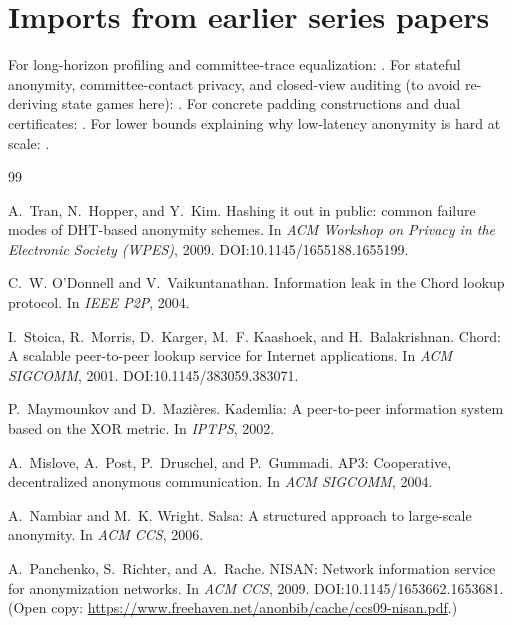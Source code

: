 \documentclass[11pt]{article}
\begin{document}
\section{Imports from earlier series papers}\label{sec:imports}
For long-horizon profiling and committee-trace equalization: \cite{series:profiling}.
For stateful anonymity, committee-contact privacy, and closed-view auditing (to avoid re-deriving state games here): \cite{series:state1,series:state2,series:state3}.
For concrete padding constructions and dual certificates: \cite{series:schedcompiler,series:knapsacktransport,series:prefixcapacities,series:stoptimeaddendum}.
For lower bounds explaining why low-latency anonymity is hard at scale: \cite{series:manytestinglowerbounds}.
\begin{thebibliography}{99}


A.~Tran, N.~Hopper, and Y.~Kim.
\newblock Hashing it out in public: common failure modes of DHT-based anonymity schemes.
\newblock In \emph{ACM Workshop on Privacy in the Electronic Society (WPES)}, 2009.
\newblock DOI:10.1145/1655188.1655199.

C.~W. O'Donnell and V.~Vaikuntanathan.
\newblock Information leak in the Chord lookup protocol.
\newblock In \emph{IEEE P2P}, 2004.

I.~Stoica, R.~Morris, D.~Karger, M.~F. Kaashoek, and H.~Balakrishnan.
\newblock Chord: A scalable peer-to-peer lookup service for Internet applications.
\newblock In \emph{ACM SIGCOMM}, 2001.
\newblock DOI:10.1145/383059.383071.

P.~Maymounkov and D.~Mazi{\`e}res.
\newblock Kademlia: A peer-to-peer information system based on the XOR metric.
\newblock In \emph{IPTPS}, 2002.

A.~Mislove, A.~Post, P.~Druschel, and P.~Gummadi.
\newblock AP3: Cooperative, decentralized anonymous communication.
\newblock In \emph{ACM SIGCOMM}, 2004.

A.~Nambiar and M.~K. Wright.
\newblock Salsa: A structured approach to large-scale anonymity.
\newblock In \emph{ACM CCS}, 2006.

A.~Panchenko, S.~Richter, and A.~Rache.
\newblock NISAN: Network information service for anonymization networks.
\newblock In \emph{ACM CCS}, 2009.
\newblock DOI:10.1145/1653662.1653681. (Open copy: \url{https://www.freehaven.net/anonbib/cache/ccs09-nisan.pdf}.)


\end{thebibliography}
\end{document}
